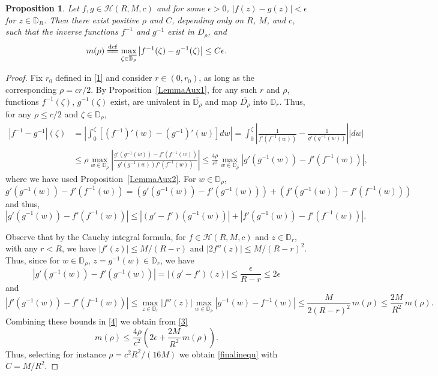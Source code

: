 \documentclass[reqno,11pt]{amsart}
\theoremstyle{plain}
\newtheorem{prop}[thm]{Proposition}
\theoremstyle{definition}
\theoremstyle{remark}
\numberwithin{equation}{section}
\numberwithin{equation}{section}
\newcommand{\D}{\mathbb{D}}
\newcommand{\isdef}{\overset{\mathrm{def}}{=\joinrel=}}
\begin{document}
\begin{prop}
    \label{LemmaAux3}
    Let $f,g \in \mathcal H(R, M, c)$ and for some $\epsilon>0$, $|f(z)-g(z)|<\epsilon$ for $z\in \D_R$. Then there exist positive $\rho$ and $C$, depending only on $R$, $M$, and $c$, such that the inverse functions $f^{-1}$ and $g^{-1}$ exist in $D_\rho$, and
\begin{equation} \label{finalinequ}
 m(\rho)\isdef \max_{\zeta\in \overline{\D_\rho}} \left| f^{-1}(\zeta) - g^{-1}(\zeta)\right| \le C\epsilon. 
\end{equation}
\end{prop}
\begin{proof}
Fix $r_0 $ defined in \eqref{1} and consider $r \in (0, r_0) $, as long as the corresponding $\rho = cr/2$.  By Proposition~\ref{LemmaAux1}, for any such $r$ and $\rho$, functions $f^{-1}(\zeta)$, $g^{-1}(\zeta)$ exist, are  univalent in $\overline{\D_{\rho}}$ and map $\overline{D_{\rho}}$ into $  \D_r$. Thus, for any $\rho \leq c/2$ and $\zeta \in \D_\rho$,
\begin{equation}\label{3}
	\begin{split}
|f^{-1}-g^{-1}|(\zeta)  & = \left|\int_0^\zeta \left[ (f^{-1})'(w) - (g^{-1})'(w)\right] dw \right| =  
\int_0^\zeta  \left |\frac 1 { f'(f^{-1}(w))} - \frac 1 { g'(g^{-1}(w))}\right | |dw | 
\\
& \le  \rho \max_{w \in \D_{\rho}}\left |\frac{ g'(g^{-1}(w) )-  f'(f^{-1}(w))} { g'(g^{-1}(w))  f'(f^{-1}(w))}  \right| \leq
    \frac {4 \rho }{c^2} \max_{w \in \D_{\rho}}\left | g'(g^{-1}(w)) - f'(f^{-1}(w)) \right| ,
    	\end{split}
\end{equation}
where we have used Proposition~\ref{LemmaAux2}. For $w \in \D_\rho$,
$$
g'(g^{-1}(w) )- f'(f^{-1}(w) )= \left( g'(g^{-1}(w)) - f'(g^{-1}(w) )\right) + \left ( f'(g^{-1}(w)) - f'(f^{-1}(w)) \right) 
$$
and thus,    
\begin{equation}\label{4}
\left | g'(g^{-1}(w) )- f'(f^{-1}(w)) \right| \leq \left | (g' - f') (g^{-1}(w)) \right| + \left | f'(g^{-1}(w)) - f'(f^{-1}(w)) \right| .
\end{equation}

Observe that by the Cauchy integral formula, for  $f\in \mathcal H(R, M, c)$ and $z\in \D_r$, with any $r < R$, we have  $|f'(z)| \leq M/(R - r)$ and $|2 f''(z)| \leq M/(R - r)^2$. 
Thus, since for $w \in \D_\rho$, $ z=g^{-1}(w) \in \D_r$, we have
$$
 \left | g'(g^{-1}(w) )- f'(g^{-1}(w)) \right| = \left | (g' - f')(z) \right| \leq \frac \epsilon{R-r} \leq 2 \epsilon
$$
and 
$$
\left | f'(g^{-1}(w)) - f'(f^{-1}(w)) \right| \leq \max_{z \in \D_r} |f''(z)|  \max_{w \in \D_\rho}\left| g^{-1}(w) - f^{-1}(w) \right|\le \frac{M}{2 (R-r)^2 }\, m(\rho)\le \frac{2M}{ R ^2 }\, m(\rho).
$$
Combining these bounds in \eqref{4} we obtain from \eqref{3}
$$
m(\rho) \leq  \frac {4 \rho }{c^2}  \left( 2\epsilon +\frac{2M}{ R ^2 }\, m(\rho) \right).
$$
Thus, selecting for instance $\rho = c^2 R^2/ (16 M)$ we obtain \eqref{finalinequ} with $C = M/R^2$. 
\end{proof}
\end{document}
